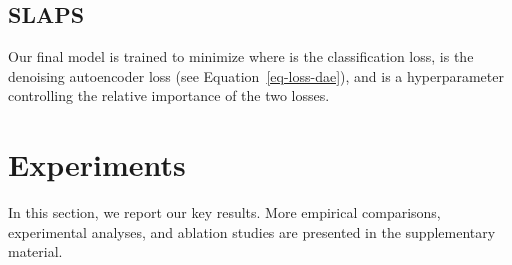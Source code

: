 \documentclass{article}
\def\Eqref#1{Equation~\ref{#1}}
\begin{document}
\subsection{SLAPS} \label{sec:slaps}
Our final model is trained to minimize  where  is the classification loss,  is the denoising autoencoder loss (see \Eqref{eq-loss-dae}), and  is a hyperparameter controlling the relative importance of the two losses.

\section{Experiments}\label{sec:experiments}

In this section, we report our key results. More empirical comparisons, experimental analyses, and ablation studies are presented in the supplementary material.

\begin{table*}[t]
\small
\caption{Results of SLAPS and the baselines on established node classification benchmarks.  indicates results have been taken from \citet{franceschi2019learning}.  indicates results have been taken from \citet{stretcu2019graph}. Bold and underlined values indicate best and second-best mean performances respectively. \emph{OOM} indicates out of memory. \emph{OOT} indicates out of time (we allowed 24h for each run). \emph{NA} indicates not applicable.}
\setlength{\tabcolsep}{3pt}
\label{tab:results}
\begin{center}
\end{center}
\end{table*}
\end{document}
